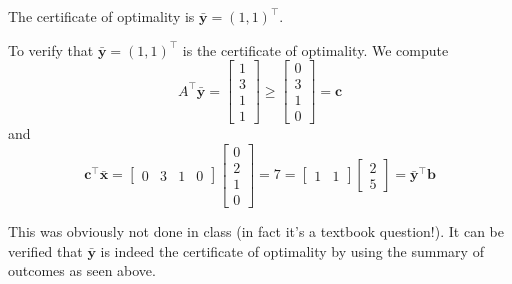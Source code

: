 \begin{exbox}
\begin{example}
        The certificate of optimality is $ \bm{\bar{y}}=(1,1)^\top $.

        To verify that $ \bm{\bar{y}}=(1,1)^\top $ is the certificate of optimality.
        We compute
        \[ A ^\top \bm{\bar{y}}=
            \begin{bmatrix}
                1 \\
                3 \\
                1 \\
                1
            \end{bmatrix}\geqslant
            \begin{bmatrix}
                0 \\
                3 \\
                1 \\
                0
            \end{bmatrix}=\bm{c}\]
        and
        \[ \bm{c}^\top \bm{\bar{x}}=
            \begin{bmatrix}
                0 & 3 & 1 & 0
            \end{bmatrix}
            \begin{bmatrix}
                0 \\
                2 \\
                1 \\
                0
            \end{bmatrix}
            =
            7
            =
            \begin{bmatrix}
                1 & 1
            \end{bmatrix}
            \begin{bmatrix}
                2 \\
                5
            \end{bmatrix}
            =
            \bm{\bar{y}}^\top \bm{b} \]
    \end{example}
\end{exbox}


\begin{remark}
    This was obviously not done in class (in fact it's a textbook question!).
    It can be verified that $ \bm{\bar{y}} $ is indeed the certificate of optimality by
    using the summary of outcomes as seen above.
\end{remark}
